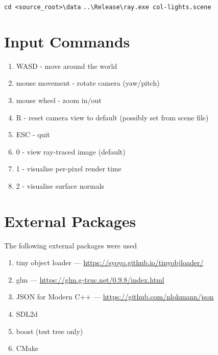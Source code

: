 \verb|cd <source_root>\data|
\verb|..\Release\ray.exe col-lights.scene|

\section{Input Commands}
    \begin{enumerate}
    \item WASD - move around the world
    \item mouse movement - rotate camera (yaw/pitch)
    \item mouse wheel - zoom in/out
    \item R - reset camera view to default (possibly set from scene file)
    \item ESC - quit
    \item 0 - view ray-traced image (default)
    \item 1 - visualise per-pixel render time
    \item 2 - visualise surface normals
    \end{enumerate}

\section{External Packages}
The following external packages were used 
\begin{enumerate}
    \item tiny object loader --- \url{https://syoyo.github.io/tinyobjloader/}
    \item glm --- \url{https://glm.g-truc.net/0.9.8/index.html}
    \item JSON for Modern C++ --- \url{https://github.com/nlohmann/json}
    \item SDL2d
    \item boost (test tree only)
    \item CMake
\end{enumerate}

